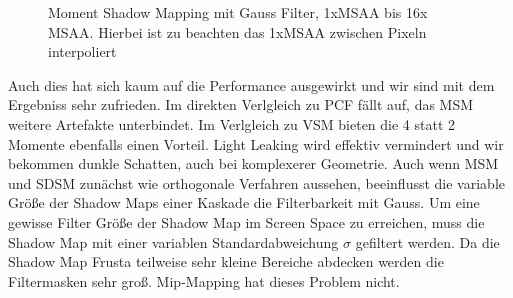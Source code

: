 \documentclass[runningheaders,a4paper]{llncs}
\begin{document}
\begin{figure}[H]
	\centering
	
	\caption{Moment Shadow Mapping mit Gauss Filter, 1xMSAA bis 16x MSAA. Hierbei ist zu beachten das 1xMSAA zwischen Pixeln interpoliert}
\end{figure}

Auch dies hat sich kaum auf die Performance ausgewirkt und wir sind mit dem Ergebniss sehr zufrieden.
Im direkten Verlgleich zu PCF fällt auf, das MSM weitere Artefakte unterbindet. Im Verlgleich zu VSM bieten die 4 statt 2 Momente ebenfalls einen Vorteil. Light Leaking wird effektiv vermindert und wir bekommen dunkle Schatten, auch bei komplexerer Geometrie.
Auch wenn MSM und SDSM zunächst wie orthogonale Verfahren aussehen, beeinflusst die variable Größe der Shadow Maps einer Kaskade die Filterbarkeit mit Gauss.
Um eine gewisse Filter Größe der Shadow Map im Screen Space zu erreichen, muss die Shadow Map mit einer variablen Standardabweichung $\sigma$ gefiltert werden.
Da die Shadow Map Frusta teilweise sehr kleine Bereiche abdecken werden die Filtermasken sehr groß.
Mip-Mapping hat dieses Problem nicht.
\end{document}
